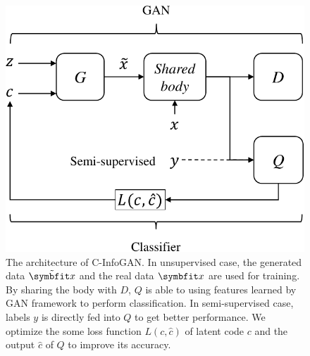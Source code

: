 \begin{figure}[htbp]
  \centering
  \includegraphics[width=\onef\textwidth]{Img/arch-cinfogan.pdf} 
  {The architecture of C-InfoGAN. In unsupervised case, the generated data $\tilde{\bd{x}}$ and the real data $\bd{x}$ are used for training. By sharing the body with $D$, $Q$ is able to using features learned by GAN framework to perform classification. In semi-supervised case, labels $y$ is directly fed into $Q$ to get better performance. We optimize the some loss function $L(c, \hat{c})$ of latent code $c$ and the output $\hat{c}$ of $Q$ to improve its accuracy.}
  \label{fig:c-infogan}
\end{figure}

